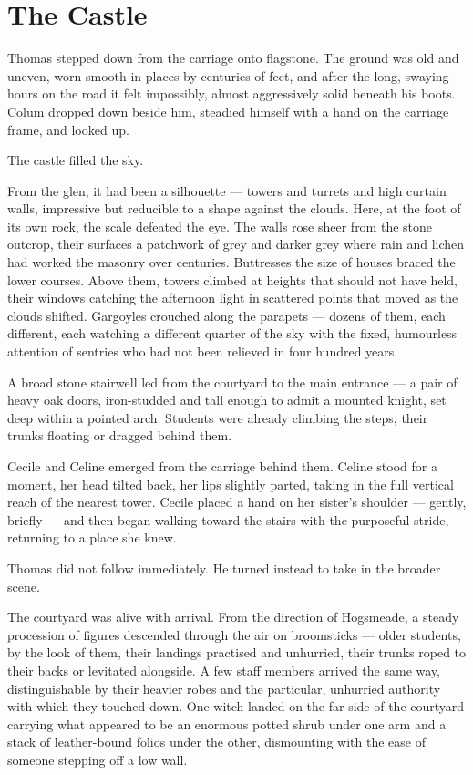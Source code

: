 
\chapter{The Castle}

Thomas stepped down from the carriage onto flagstone. The ground was old and uneven, worn smooth in places by centuries of feet, and after the long, swaying hours on the road it felt impossibly, almost aggressively solid beneath his boots. Colum dropped down beside him, steadied himself with a hand on the carriage frame, and looked up.

The castle filled the sky.

From the glen, it had been a silhouette --- towers and turrets and high curtain walls, impressive but reducible to a shape against the clouds. Here, at the foot of its own rock, the scale defeated the eye. The walls rose sheer from the stone outcrop, their surfaces a patchwork of grey and darker grey where rain and lichen had worked the masonry over centuries. Buttresses the size of houses braced the lower courses. Above them, towers climbed at heights that should not have held, their windows catching the afternoon light in scattered points that moved as the clouds shifted. Gargoyles crouched along the parapets --- dozens of them, each different, each watching a different quarter of the sky with the fixed, humourless attention of sentries who had not been relieved in four hundred years.

A broad stone stairwell led from the courtyard to the main entrance --- a pair of heavy oak doors, iron-studded and tall enough to admit a mounted knight, set deep within a pointed arch. Students were already climbing the steps, their trunks floating or dragged behind them.

Cecile and Celine emerged from the carriage behind them. Celine stood for a moment, her head tilted back, her lips slightly parted, taking in the full vertical reach of the nearest tower. Cecile placed a hand on her sister's shoulder --- gently, briefly --- and then began walking toward the stairs with the purposeful stride, returning to a place she knew.

Thomas did not follow immediately. He turned instead to take in the broader scene.

The courtyard was alive with arrival. From the direction of Hogsmeade, a steady procession of figures descended through the air on broomsticks --- older students, by the look of them, their landings practised and unhurried, their trunks roped to their backs or levitated alongside. A few staff members arrived the same way, distinguishable by their heavier robes and the particular, unhurried authority with which they touched down. One witch landed on the far side of the courtyard carrying what appeared to be an enormous potted shrub under one arm and a stack of leather-bound folios under the other, dismounting with the ease of someone stepping off a low wall.

